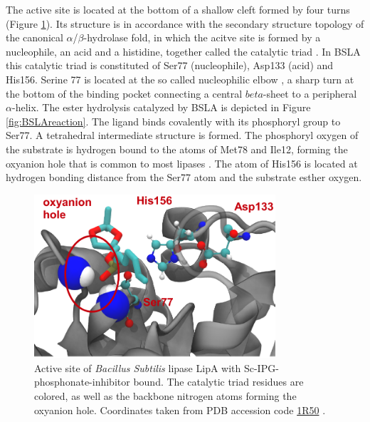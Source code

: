 \documentclass[english, a4paper, 12pt, titlepage, draft]{article}
\newcommand{\PDB}[1]{
    \href{http://pdb.rcsb.org/pdb/explore/explore.do?structureId=#1}{#1}
}
\begin{document}
The active site is located at the bottom of a shallow cleft formed by four turns (Figure \ref{fig:BSLAactiveSite}).
Its structure is in accordance with the secondary structure topology of the canonical $\alpha$/$\beta$-hydrolase fold, in which the acitve site is formed by a nucleophile, an acid and a histidine, together called the catalytic triad \cite{BSLA_1I6W}.
In BSLA this catalytic triad is constituted of Ser77 (nucleophile), Asp133 (acid) and His156.
Serine 77 is located at the so called nucleophilic elbow \cite{nucleophileElbow}, a sharp turn at the bottom of the binding pocket connecting a central $beta$-sheet to a peripheral $\alpha$-helix.
The ester hydrolysis catalyzed by BSLA is depicted in Figure \ref{fig:BSLAreaction}.
The ligand binds covalently with its phosphoryl group to Ser77.
A tetrahedral intermediate structure is formed.
The phosphoryl oxygen of the substrate is hydrogen bound to the  atoms of Met78 and Ile12, forming the oxyanion hole that is common to most lipases \cite{BSLA_1I6W}.
The  atom of His156 is located at hydrogen bonding distance from the Ser77  atom and the substrate esther oxygen.






\begin{figure}
    \centering
    \includegraphics[width=0.8\textwidth]{figures/BSLA_pocket/BSLA_pocket_cartoon.pdf}
    \caption{Active site of \textit{Bacillus Subtilis} lipase LipA with Sc-IPG-phosphonate-inhibitor bound.
    The catalytic triad residues are colored, as well as the backbone nitrogen atoms forming the oxyanion hole.
    Coordinates taken from PDB accession code \PDB{1R50}.}
    \label{fig:BSLAactiveSite}
\end{figure} 
\end{document}
